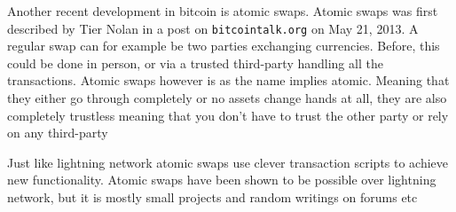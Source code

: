 
Another recent development in bitcoin is atomic swaps. Atomic swaps was first described by Tier Nolan in a post on
\texttt{bitcointalk.org} on May 21, 2013.\cite{tier_nolan}
A regular swap can for example be two parties exchanging currencies. Before,
this could be done in person, or via a trusted third-party handling all the
transactions. Atomic swaps however is as the name implies atomic. Meaning that
they either go through completely or no assets change hands at all, they are
also completely trustless meaning that you don't have to trust the
other party or rely on any third-party

Just like lightning network atomic swaps use clever transaction scripts to
achieve new functionality. Atomic swaps have been shown to be possible over
lightning network, but it is mostly small projects and random writings on
forums etc


